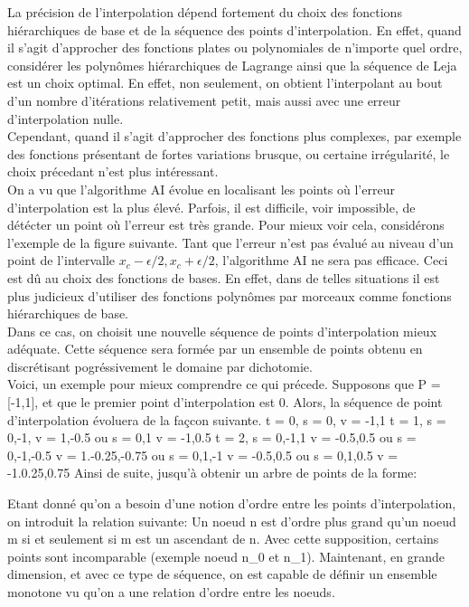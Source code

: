 La précision de l'interpolation dépend fortement du choix des fonctions hiérarchiques de base et de la séquence des points d'interpolation.
En effet, quand il s'agit d'approcher des fonctions plates ou polynomiales de n'importe quel ordre, considérer les polynômes hiérarchiques de Lagrange ainsi que la séquence de Leja est un
choix optimal. En effet, non seulement, on obtient l'interpolant au bout d'un nombre d'itérations relativement petit, mais aussi avec une erreur d'interpolation nulle. \\
Cependant, quand il s'agit d'approcher des fonctions plus complexes, par exemple des fonctions présentant de fortes variations brusque, ou certaine irrégularité, le choix précedant n'est
plus intéressant.\\
On a vu que l'algorithme AI évolue en localisant les points où l'erreur d'interpolation est la plus élevé. Parfois, il est difficile, voir impossible, de détécter
un point où l'erreur est très grande. Pour mieux voir cela, considérons l'exemple de la figure suivante.
Tant que l'erreur n'est pas évalué au niveau d'un point de l'intervalle $x_c-\epsilon/2, x_c+\epsilon/2$, l'algorithme AI ne sera pas efficace.
Ceci est dû au choix des fonctions de bases. En effet, dans de telles situations il est plus judicieux d'utiliser des fonctions polynômes par morceaux comme fonctions hiérarchiques de base.\\
Dans ce cas, on choisit une nouvelle séquence de points d'interpolation mieux adéquate. Cette séquence sera formée par un ensemble de points obtenu en discrétisant pogréssivement le domaine par dichotomie.\\
Voici, un exemple pour mieux comprendre ce qui précede.
Supposons que P = [-1,1], et que le premier point d'interpolation est 0. Alors, la séquence de point d'interpolation évoluera de la façcon suivante.
t = 0, s = {0}, v = {-1,1}
t = 1, s = {0,-1}, v = {1,-0.5} ou s = {0,1} v = {-1,0.5}
t = 2, s = {0,-1,1} v = {-0.5,0.5} ou s = {0,-1,-0.5} v = {1.-0.25,-0.75} ou s = {0,1,-1} v = {-0.5,0.5} ou s = {0,1,0.5} v = {-1.0.25,0.75}
Ainsi de suite, jusqu'à obtenir un arbre de points de la forme:

Etant donné qu'on a besoin d'une notion d'ordre entre les points d'interpolation, on introduit la relation suivante:
Un noeud n est d'ordre plus grand qu'un noeud m si et seulement si m est un ascendant de n. Avec cette supposition, certains points sont incomparable (exemple noeud n_0 et n_1).
Maintenant, en grande dimension, et avec ce type de séquence, on est capable de définir un ensemble monotone vu qu'on a une relation d'ordre entre les noeuds.


